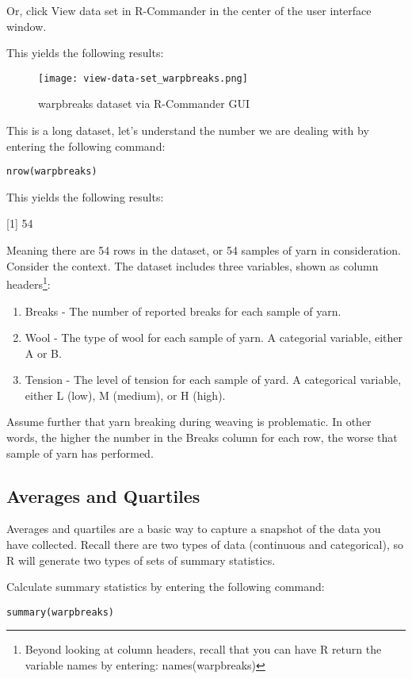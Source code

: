 Or, click View data set in R-Commander in the center of the user interface window.

This yields the following results:

\begin{figure}[h!]
\texttt{[image: view-data-set\_warpbreaks.png]}
 \caption{warpbreaks dataset via R-Commander GUI}
 \label{fig:view-data-set_warpbreaks}
\end{figure}

This is a long dataset, let's understand the number we are dealing with by entering the following command:

\texttt{nrow(warpbreaks)}

This yields the following results:

[1] 54

Meaning there are 54 rows in the dataset, or 54 samples of yarn in consideration. Consider the context. The dataset includes three variables, shown as column headers\footnote{Beyond looking at column headers, recall that you can have R return the variable names by entering: names(warpbreaks)}:

\begin{enumerate}
 \item Breaks - The number of reported breaks for each sample of yarn.
 \item Wool - The type of wool for each sample of yarn. A categorial variable, either A or B.
 \item Tension - The level of tension for each sample of yard. A categorical variable, either L (low), M (medium), or H (high).
\end{enumerate}

Assume further that yarn breaking during weaving is problematic. In other words, the higher the number in the Breaks column for each row, the worse that sample of yarn has performed. 

\subsection{Averages and Quartiles}
Averages and quartiles are a basic way to capture a snapshot of the data you have collected. Recall there are two types of data (continuous and categorical), so R will generate two types of sets of summary statistics.

Calculate summary statistics by entering the following command:

\texttt{summary(warpbreaks)}

